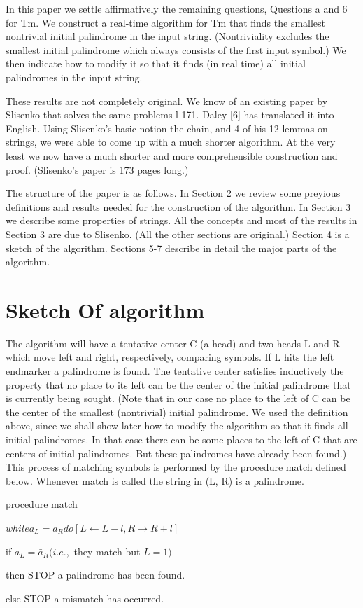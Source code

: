 \documentclass[11pt,a4paper]{report}
\begin{document}
In this paper we settle affirmatively the remaining questions, Questions a and 6 for Tm.
We construct a real-time algorithm for Tm that finds the smallest nontrivial initial
palindrome in the input string. (Nontriviality excludes the smallest initial palindrome
which always consists of the first input symbol.) We then indicate how to modify it so
that it finds (in real time) all initial palindromes in the input string.

These results are not completely original. We know of an existing paper by Slisenko
that solves the same problems l-171. Daley [6] has translated it into English. Using
Slisenko’s basic notion-the chain, and 4 of his 12 lemmas on strings, we were able to
come up with a much shorter algorithm. At the very least we now have a much shorter
and more comprehensible construction and proof. (Slisenko’s paper is 173 pages long.)

The structure of the paper is as follows. In Section 2 we review some preyious definitions
and results needed for the construction of the algorithm. In Section 3 we describe some
properties of strings. All the concepts and most of the results in Section 3 are due to
Slisenko. (All the other sections are original.) Section 4 is a sketch of the algorithm.
Sections 5-7 describe in detail the major parts of the algorithm. 

\chapter{Sketch Of algorithm}

The algorithm will have a tentative center C (a head) and two heads L and R which
move left and right, respectively, comparing symbols. If L hits the left endmarker a
palindrome is found. The tentative center satisfies inductively the property that no place
to its left can be the center of the initial palindrome that is currently being sought.
(Note that in our case no place to the left of C can be the center of the smallest (nontrivial)
initial palindrome. We used the definition above, since we shall show later how to modify
the algorithm so that it finds all initial palindromes. In that case there can be some places
to the left of C that are centers of initial palindromes. But these palindromes have already
been found.) This process of matching symbols is performed by the procedure match
defined below. Whenever match is called the string in (L, R) is a palindrome.

procedure match
\begin{myindentpar}{2em}
$
while a_L=a_R do[L\leftarrow L-l,R \rightarrow R+l]$
\begin{myindentpar}{2em}

if $a_L = \bar{a}_R (i.e.,$ they  match but  $L = 1)$
\begin{myindentpar}{2em}

then STOP-a palindrome has been found.
\end{myindentpar}

else STOP-a mismatch has occurred.

\end{myindentpar}

\end{myindentpar}
\end{document}
